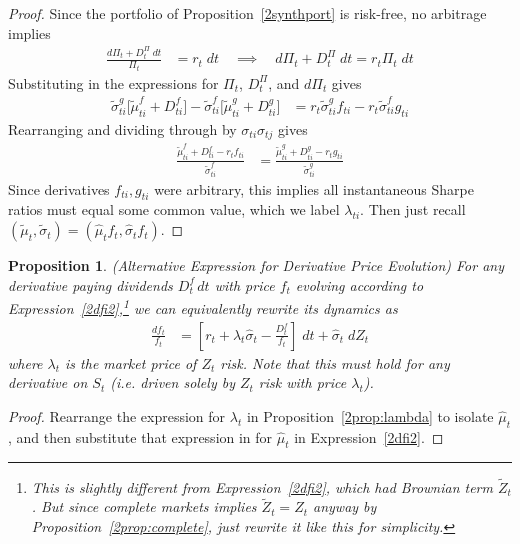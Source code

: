 \documentclass[12pt]{article}
\theoremstyle{plain}
\newtheorem{prop}[thm]{Proposition}
\theoremstyle{definition}
\theoremstyle{remark}
\begin{document}
\begin{proof}
Since the portfolio of Proposition~\ref{2synthport} is risk-free, no
arbitrage implies
\begin{align*}
  \frac{d\Pi_t + D_t^\Pi\;dt}{\Pi_t}
  &= r_t\; dt
  \quad\implies\quad
  d\Pi_t  + D_t^\Pi\;dt
  = r_t\Pi_t\; dt
\end{align*}
Substituting in the expressions for $\Pi_t$, $D_t^\Pi$, and $d\Pi_t$
gives
\begin{align*}
  \tilde{\sigma}_{ti}^g
  \big[\tilde{\mu}_{ti}^f+D_{ti}^f\big]
  -
  \tilde{\sigma}_{ti}^f
  \big[\tilde{\mu}_{ti}^g+D_{ti}^g\big]
  &=
  r_t \tilde{\sigma}_{ti}^g
  f_{ti}
  - r_t\tilde{\sigma}_{ti}^f
  g_{ti}
\end{align*}
Rearranging and dividing through by $\sigma_{ti}\sigma_{tj}$ gives
\begin{align*}
  \frac{\tilde{\mu}_{ti}^f+D_{ti}^f-r_t f_{ti}}{\tilde{\sigma}_{ti}^f}
  &=
  \frac{\tilde{\mu}_{ti}^g+D_{ti}^g-r_t g_{ti}}{\tilde{\sigma}_{ti}^g}
\end{align*}
Since derivatives $f_{ti},g_{ti}$ were arbitrary, this implies all
instantaneous Sharpe ratios must equal some common value, which we label
$\lambda_{ti}$.
Then just recall
$(\tilde{\mu}_t,\tilde{\sigma}_t)=(\hat{\mu}_tf_t,\hat{\sigma}_tf_t)$.
\end{proof}

\begin{prop}
\emph{(Alternative Expression for Derivative Price Evolution)}
For any derivative paying dividends $D^f_t\,dt$ with price $f_t$
evolving according to Expression~\ref{2dfi2},\footnote{%
  This is slightly different from Expression~\ref{2dfi2}, which had
  Brownian term $\tilde{Z}_t$.
  But since complete markets implies $\tilde{Z}_t=Z_t$ anyway by
  Proposition~\ref{2prop:complete}, just rewrite it like this for
  simplicity.
}
we can equivalently rewrite its dynamics as
\begin{align}
  \frac{df_{t}}{f_t}
  &=
  \left[
  r_t+\lambda_t\hat{\sigma}_{t}
  -\frac{D_{t}^f}{f_{t}}
  \right]
  \; dt
  +
  \hat{\sigma}_t
  \;dZ_t
  \label{2dflambda}
\end{align}
where $\lambda_t$ is the market price of $Z_t$ risk.
Note that this must hold for \emph{any} derivative on $S_t$ (i.e. driven
solely by $Z_t$ risk with price $\lambda_t$).
\end{prop}
\begin{proof}
Rearrange the expression for $\lambda_t$ in
Proposition~\ref{2prop:lambda} to isolate $\hat{\mu}_t$, and then
substitute that expression in for $\hat{\mu}_t$ in
Expression~\ref{2dfi2}.
\end{proof}
\end{document}
